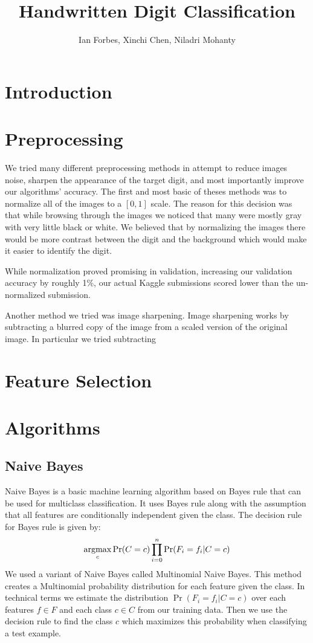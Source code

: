 \documentclass[10pt,twocolumn]{article}
\title{Handwritten Digit Classification}
\author{Ian Forbes, Xinchi Chen, Niladri Mohanty}
\newcommand{\argmax}{\operatornamewithlimits{argmax}}
\begin{document}
\section{Introduction}
\section{Preprocessing}
We tried many different preprocessing methods in attempt to reduce images noise, sharpen the appearance of the target digit, and most importantly improve our algorithms' accuracy. The first and most basic of theses methods was to normalize all of the images to a $[0,1]$ scale. The reason for this decision was that while browsing through the images we noticed that many were mostly gray with very little black or white. We believed that by normalizing the images there would be more contrast between the digit and the background which would make it easier to identify the digit.

While normalization proved promising in validation, increasing our validation accuracy by roughly 1\%, our actual Kaggle submissions scored lower than the un-normalized submission.

Another method we tried was image sharpening. Image sharpening works by subtracting a blurred copy of the image from a scaled version of the original image. In particular we tried subtracting 
\section{Feature Selection}
\section{Algorithms}
\subsection{Naive Bayes}
Naive Bayes is a basic machine learning algorithm based on Bayes rule that can be used for multiclass classification. It uses Bayes rule along with the assumption that all features are conditionally independent given the class. The decision rule for Bayes rule is given by:
\[ \argmax_c \Pr(C = c) \prod_{i=0}^{n} \Pr(F_i = f_i | C = c)\]
We used a variant of Naive Bayes called Multinomial Naive Bayes. This method creates a Multinomial probability distribution for each feature given the class. In technical terms we estimate the distribution $\Pr(F_i = f_i | C = c)$ over each features $f \in F$ and each class $ c \in C$ from our training data. Then we use the decision rule to find the class $c$ which maximizes this probability when classifying a test example.
\end{document}
